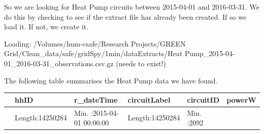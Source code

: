 \documentclass[]{article}
\begin{document}
So we are looking for Heat Pump circuits between 2015-04-01 and
2016-03-31. We do this by checking to see if the extract file has
already been created. If so we load it. If not, we create it.

Loading: /Volumes/hum-csafe/Research Projects/GREEN
Grid/Clean\_data/safe/gridSpy/1min/dataExtracts/Heat
Pump\_2015-04-01\_2016-03-31\_observations.csv.gz (needs to exist!)

The following table summarises the Heat Pump data we have found.

\begin{longtable}[]{@{}llllll@{}}
\toprule
\begin{minipage}[b]{0.03\columnwidth}\raggedright\strut
\strut
\end{minipage} & \begin{minipage}[b]{0.15\columnwidth}\raggedright\strut
hhID\strut
\end{minipage} & \begin{minipage}[b]{0.24\columnwidth}\raggedright\strut
r\_dateTime\strut
\end{minipage} & \begin{minipage}[b]{0.15\columnwidth}\raggedright\strut
circuitLabel\strut
\end{minipage} & \begin{minipage}[b]{0.12\columnwidth}\raggedright\strut
circuitID\strut
\end{minipage} & \begin{minipage}[b]{0.15\columnwidth}\raggedright\strut
powerW\strut
\end{minipage}\tabularnewline
\midrule
\endhead
\begin{minipage}[t]{0.03\columnwidth}\raggedright\strut
\strut
\end{minipage} & \begin{minipage}[t]{0.15\columnwidth}\raggedright\strut
Length:14250284\strut
\end{minipage} & \begin{minipage}[t]{0.24\columnwidth}\raggedright\strut
Min. :2015-04-01 00:00:00\strut
\end{minipage} & \begin{minipage}[t]{0.15\columnwidth}\raggedright\strut
Length:14250284\strut
\end{minipage} & \begin{minipage}[t]{0.12\columnwidth}\raggedright\strut
Min. :2092\strut
\end{minipage} & \begin{minipage}[t]{0.15\columnwidth}\raggedright\strut

\end{minipage}
\end{longtable}
\end{document}
